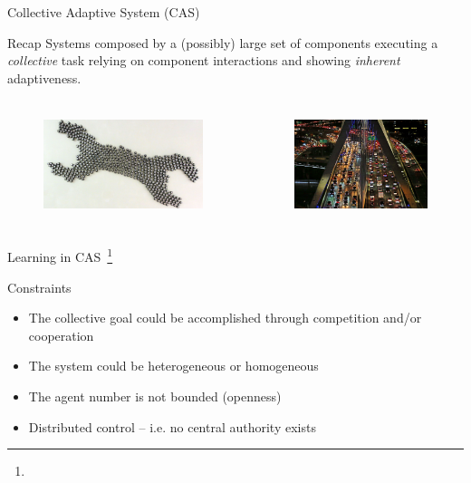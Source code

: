 \documentclass[presentation]{beamer}\mode<presentation>{\usetheme{AMSBolognaFC}}
\begin{document}
\begin{frame}{Collective Adaptive System (CAS)}
	\begin{alertblock}{Recap}
		Systems composed by a (possibly) large set of components executing a \emph{collective} task relying on component interactions and showing \emph{inherent} adaptiveness. 
	\end{alertblock}
	\begin{columns}
		\begin{column}{0.5\textwidth}		
			\begin{figure}
				\includegraphics[height=3cm]{img/cas-1}
			\end{figure}
		\end{column}
	

		\begin{column}{0.5\textwidth}	
			\begin{figure}
				\includegraphics[height=3cm]{img/cas-3}
			\end{figure}
		\end{column}
	\end{columns}
\end{frame}
\begin{frame}[c]{Learning in CAS~\footnote[frame]{}}
\begin{exampleblock}{Constraints}
	\begin{itemize}
		\item The collective goal could be accomplished through competition and/or cooperation 
		\item The system could be heterogeneous or homogeneous
		\item The agent number is not bounded (openness)
		\item Distributed control -- i.e. no central authority exists
	\end{itemize}
\end{exampleblock}
\end{frame}
\end{document}
